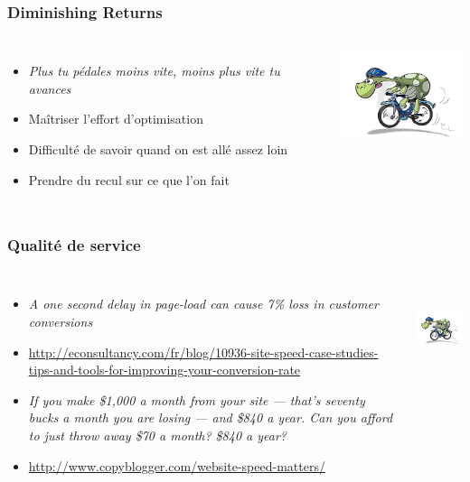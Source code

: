 \documentclass{beamer}
\begin{document}
\begin{frame}
  \frametitle{Diminishing Returns}

  \vfill

\begin{columns}[c]

  \begin{itemize}
  \item \textit{Plus tu pédales moins vite, moins plus vite tu avances}
  \item Maîtriser l'effort d'optimisation
  \item Difficulté de savoir quand on est allé assez loin
  \item Prendre du recul sur ce que l'on fait
  \end{itemize}

\begin{center}
  \includegraphics[height=7em]{cartoon-velo.jpg}
\end{center}
\end{columns}
\end{frame}

\begin{frame}
  \frametitle{Qualité de service}


\begin{columns}[c]

  \begin{itemize}
    \item \textit{A one second delay in page-load can cause 7\% loss in customer conversions}
    \item \url{http://econsultancy.com/fr/blog/10936-site-speed-case-studies-tips-and-tools-for-improving-your-conversion-rate}
    \item \textit{If you make \$1,000 a month from your site — that’s seventy bucks a month you are losing — and \$840 a year. Can you afford to just throw away \$70 a month? \$840 a year?}
    \item \url{http://www.copyblogger.com/website-speed-matters/}
  \end{itemize}

\begin{center}
  \includegraphics[height=7em]{cartoon-velo.jpg}
\end{center}
\end{columns}
\end{frame}
\end{document}
